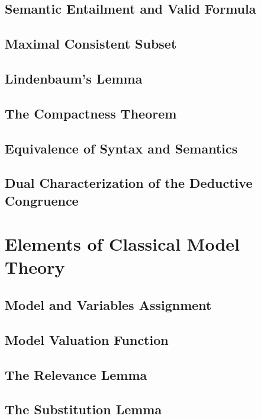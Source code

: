 \documentclass{report}
\begin{document}
    \subsection{Semantic Entailment and Valid Formula}
      
    \subsection{Maximal Consistent Subset}
      
    \subsection{Lindenbaum's Lemma}
      
    \subsection{The Compactness Theorem}
      
    \subsection{Equivalence of Syntax and Semantics}
      
    \subsection{Dual Characterization of the Deductive Congruence}
      
\section{Elements of Classical Model Theory}
    \subsection{Model and Variables Assignment}
      
    \subsection{Model Valuation Function}
      
    \subsection{The Relevance Lemma}
      
    \subsection{The Substitution Lemma}
      
\end{document}
